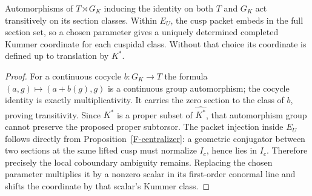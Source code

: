 \begin{proposition}
\label{F-twist}
Automorphisms of $T\rtimes G_K$ inducing the identity on both
$T$ and $G_K$ act transitively on its section classes. Within
$E_U$, the cusp packet embeds in the full section set, so a
chosen parameter gives a uniquely determined completed Kummer
coordinate for each cuspidal class. Without that choice its
coordinate is defined up to translation by $K^*$.
\end{proposition}
\begin{proof}
For a continuous cocycle $b:G_K\to T$ the formula
$(a,g)\mapsto(a+b(g),g)$ is a continuous group automorphism;
the cocycle identity is exactly multiplicativity. It carries the
zero section to the class of $b$, proving transitivity. Since
$K^*$ is a proper subset of $\widehat{K^*}$, that automorphism
group cannot preserve the proposed proper subtorsor. The packet
injection inside $E_U$ follows directly from
Proposition~\ref{F-centralizer}: a geometric conjugator between
two sections at the same lifted cusp must normalize $I_c$,
hence lies in $I_c$. Therefore precisely the local coboundary
ambiguity remains. Replacing the chosen parameter multiplies it
by a nonzero scalar in its first-order conormal line and shifts
the coordinate by that scalar's Kummer class.
\end{proof}

